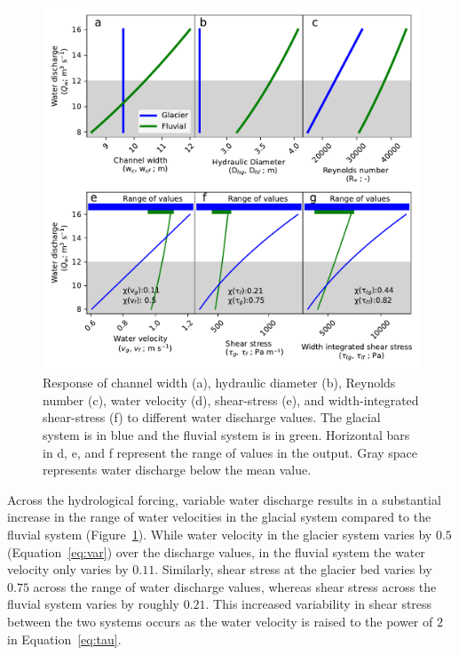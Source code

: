 \documentclass[11pt]{article}
\begin{document}
\begin{spacing}{1}
          \begin{center}
            \begin{figure}[H]
              \includegraphics[width=0.9\linewidth]{model_outputs.pdf}
              \caption{Response of channel width (a), hydraulic diameter (b),  Reynolds number  (c),  water velocity (d), shear-stress (e), and width-integrated shear-stress (f)  to different water discharge values. The glacial system is in blue and the fluvial system is in green.  Horizontal bars in d, e, and f represent the range of values in the  output. Gray space represents water discharge below the mean value. }
              \label{fig:model_outs}
            \end{figure}
          \end{center}
          
          Across the hydrological forcing, variable water discharge results in a substantial increase in the range of water velocities in the glacial system compared to the fluvial system (Figure~\ref{fig:model_outs}).
          While water velocity in the glacier system varies by  $0.5$ (Equation~\ref{eq:var}) over the discharge values, in the fluvial system the water velocity only varies by $0.11$.
          Similarly, shear stress at the glacier bed varies by $0.75$ across the range of water discharge values, whereas shear stress across the fluvial system varies by roughly $0.21$. This increased variability  in shear stress between the two systems occurs as the water velocity is raised to the power of $2$ in Equation~\ref{eq:tau}. 
          

\end{spacing}
\end{document}
